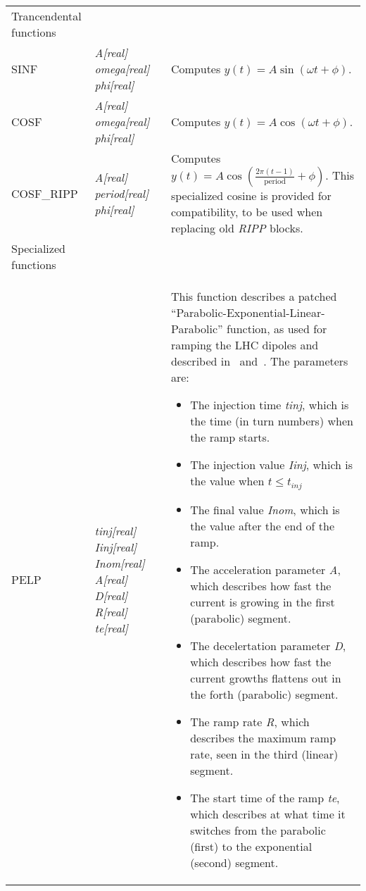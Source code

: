 \documentclass[a4paper,11pt]{report}
\begin{document}
\begin{center}
\begin{longtable}{|p{2.25cm} | p{4cm} p{9.5cm}|}
  \hline
  \rowcolor{blue!15}
  Trancendental functions & & \\*

  SINF        & \emph{A[real] omega[real] phi[real]} & 
  Computes $y(t) = A\sin\left(\omega t + \phi\right)$.\\*

  COSF        & \emph{A[real] omega[real] phi[real]} & 
  Computes $y(t) = A\cos\left(\omega t + \phi\right)$.\\*
  COSF\_RIPP  & \emph{A[real] period[real] phi[real]} & 
  Computes $y(t) = A\cos\left(\frac{2\pi (t-1)}{\mathrm{period}} + \phi\right)$. 
  This specialized cosine is provided for compatibility, to be used when replacing old \emph{RIPP} blocks.\\*

  \hline
  \rowcolor{blue!15}
  Specialized functions & & \\*

  PELP        & \emph{tinj[real] Iinj[real] Inom[real] A[real] D[real] R[real] te[real]} & 
  This function describes a patched ``Parabolic-Exponential-Linear-Parabolic'' function, as used for ramping the LHC dipoles and described in~\cite[Appendix C]{SRussen:fieldComp} and~\cite{BurlaKing:CurrentRamp}. 
  The parameters are:
  \begin{itemize}
  \setlength\itemsep{-0.3em}
  \item The injection time \emph{tinj}, which is the time (in turn numbers) when the ramp starts.
  \item The injection value \emph{Iinj}, which is the value when $t\le t_{inj}$
  \item The final value \emph{Inom}, which is the value after the end of the ramp.
  \item The acceleration parameter \emph{A}, which describes how fast the current is growing in the first (parabolic) segment.
  \item The decelertation parameter \emph{D}, which describes how fast the current growths flattens out in the forth (parabolic) segment.
  \item The ramp rate \emph{R}, which describes the maximum ramp rate, seen in the third (linear) segment.
  \item The start time of the ramp \emph{te}, which describes at what time it switches from the parabolic (first) to the exponential (second) segment.
  \end{itemize}
  \\*
\end{longtable}
\end{center}
\end{document}
